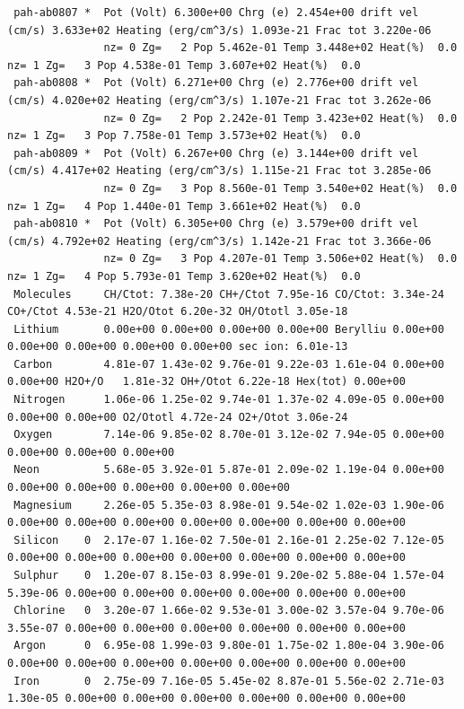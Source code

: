 {\begin{verbatim}
 pah-ab0807 *  Pot (Volt) 6.300e+00 Chrg (e) 2.454e+00 drift vel (cm/s) 3.633e+02 Heating (erg/cm^3/s) 1.093e-21 Frac tot 3.220e-06
               nz= 0 Zg=   2 Pop 5.462e-01 Temp 3.448e+02 Heat(%)  0.0      nz= 1 Zg=   3 Pop 4.538e-01 Temp 3.607e+02 Heat(%)  0.0
 pah-ab0808 *  Pot (Volt) 6.271e+00 Chrg (e) 2.776e+00 drift vel (cm/s) 4.020e+02 Heating (erg/cm^3/s) 1.107e-21 Frac tot 3.262e-06
               nz= 0 Zg=   2 Pop 2.242e-01 Temp 3.423e+02 Heat(%)  0.0      nz= 1 Zg=   3 Pop 7.758e-01 Temp 3.573e+02 Heat(%)  0.0
 pah-ab0809 *  Pot (Volt) 6.267e+00 Chrg (e) 3.144e+00 drift vel (cm/s) 4.417e+02 Heating (erg/cm^3/s) 1.115e-21 Frac tot 3.285e-06
               nz= 0 Zg=   3 Pop 8.560e-01 Temp 3.540e+02 Heat(%)  0.0      nz= 1 Zg=   4 Pop 1.440e-01 Temp 3.661e+02 Heat(%)  0.0
 pah-ab0810 *  Pot (Volt) 6.305e+00 Chrg (e) 3.579e+00 drift vel (cm/s) 4.792e+02 Heating (erg/cm^3/s) 1.142e-21 Frac tot 3.366e-06
               nz= 0 Zg=   3 Pop 4.207e-01 Temp 3.506e+02 Heat(%)  0.0      nz= 1 Zg=   4 Pop 5.793e-01 Temp 3.620e+02 Heat(%)  0.0
 Molecules     CH/Ctot: 7.38e-20 CH+/Ctot 7.95e-16 CO/Ctot: 3.34e-24 CO+/Ctot 4.53e-21 H2O/Otot 6.20e-32 OH/Ototl 3.05e-18
 Lithium       0.00e+00 0.00e+00 0.00e+00 0.00e+00 Berylliu 0.00e+00 0.00e+00 0.00e+00 0.00e+00 0.00e+00 sec ion: 6.01e-13
 Carbon        4.81e-07 1.43e-02 9.76e-01 9.22e-03 1.61e-04 0.00e+00 0.00e+00 H2O+/O   1.81e-32 OH+/Otot 6.22e-18 Hex(tot) 0.00e+00
 Nitrogen      1.06e-06 1.25e-02 9.74e-01 1.37e-02 4.09e-05 0.00e+00 0.00e+00 0.00e+00 O2/Ototl 4.72e-24 O2+/Otot 3.06e-24
 Oxygen        7.14e-06 9.85e-02 8.70e-01 3.12e-02 7.94e-05 0.00e+00 0.00e+00 0.00e+00 0.00e+00
 Neon          5.68e-05 3.92e-01 5.87e-01 2.09e-02 1.19e-04 0.00e+00 0.00e+00 0.00e+00 0.00e+00 0.00e+00 0.00e+00
 Magnesium     2.26e-05 5.35e-03 8.98e-01 9.54e-02 1.02e-03 1.90e-06 0.00e+00 0.00e+00 0.00e+00 0.00e+00 0.00e+00 0.00e+00 0.00e+00
 Silicon    0  2.17e-07 1.16e-02 7.50e-01 2.16e-01 2.25e-02 7.12e-05 0.00e+00 0.00e+00 0.00e+00 0.00e+00 0.00e+00 0.00e+00 0.00e+00
 Sulphur    0  1.20e-07 8.15e-03 8.99e-01 9.20e-02 5.88e-04 1.57e-04 5.39e-06 0.00e+00 0.00e+00 0.00e+00 0.00e+00 0.00e+00 0.00e+00
 Chlorine   0  3.20e-07 1.66e-02 9.53e-01 3.00e-02 3.57e-04 9.70e-06 3.55e-07 0.00e+00 0.00e+00 0.00e+00 0.00e+00 0.00e+00 0.00e+00
 Argon      0  6.95e-08 1.99e-03 9.80e-01 1.75e-02 1.80e-04 3.90e-06 0.00e+00 0.00e+00 0.00e+00 0.00e+00 0.00e+00 0.00e+00 0.00e+00
 Iron       0  2.75e-09 7.16e-05 5.45e-02 8.87e-01 5.56e-02 2.71e-03 1.30e-05 0.00e+00 0.00e+00 0.00e+00 0.00e+00 0.00e+00 0.00e+00
\end{verbatim}
}

